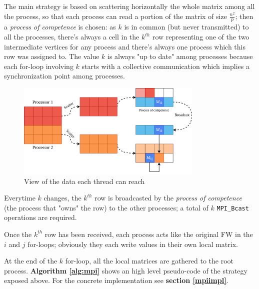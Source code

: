 The main strategy is based on scattering horizontally the whole matrix among all the process, so that
each process can read a portion of the matrix of size $\frac{n^2}{p}$; then a \emph{process of competence}
is chosen: as $k$ is in common (but never transmitted) to all the processes, there's always a cell in the $k^{th}$
row representing one of the two intermediate vertices for any process and there's always one process which this row was assigned to.
The value $k$ is always "up to date" among processes because each for-loop involving $k$ starts with a collective communication
which implies a synchronization point among processes.

\begin{figure}[h!]
\centering                                                                        
\includegraphics[width=3.5in]{diagrams/mpi-scatter}
\captionsetup{justification=centering}                                                                                                                                   
\caption{View of the data each thread can reach}                                                                                                                                            
\label{fig:threads}                                                                                                                                                           
\end{figure}
Everytime $k$ changes, the $k^{th}$ row is broadcasted by the \emph{process of competence} (the process that "owns" the row) to the other processes;
a total of $k$ \texttt{MPI\_Bcast} operations are required. \par
Once the $k^{th}$ row has been received, each process acts like the original FW in the $i$ and $j$ for-loops; obviously
they each write values in their own local matrix. \par

At the end of the $k$ for-loop, all the local matrices are gathered to the root process. 
\textbf{Algorithm \ref*{alg:mpi}} shows an high level pseudo-code of the strategy exposed above. For the concrete implementation see \textbf{section \ref{mpiimpl}}.\par

